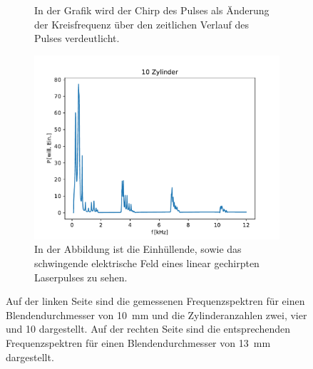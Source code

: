 \begin{figure}[ht]
\begin{subfigure}[b]{0.45\textwidth}
                    \caption{In der Grafik wird der Chirp des Pulses als Änderung der Kreisfrequenz über den zeitlichen Verlauf des Pulses verdeutlicht.}
                    \label{fig:1dim_10_Zylinder_10mm}
                \end{subfigure}
                \centering
                \begin{subfigure}[b]{0.45\textwidth}
                    \centering
                    \includegraphics[scale=0.45]{./pictures/1dim_10_Zylinder_13mm.pdf}
                    \caption{In der Abbildung ist die Einhüllende, sowie das schwingende elektrische Feld eines linear gechirpten Laserpulses zu sehen.}
                    \label{fig:1dim_10_Zylinder_13mm}
                \end{subfigure}
                \caption{Auf der linken Seite sind die gemessenen Frequenzspektren für einen Blendendurchmesser von \SI{10}{\milli\metre} und die Zylinderanzahlen zwei, vier und 10 dargestellt. Auf der rechten Seite sind die entsprechenden Frequenzspektren für einen Blendendurchmesser von \SI{13}{\milli\metre} dargestellt.}
                \label{10mm_16mm_blende}
            \end{figure}
            \FloatBarrier


